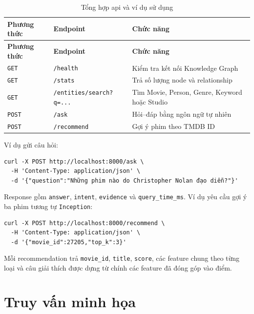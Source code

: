 \begin{longtable}{|>{\raggedright\arraybackslash}p{}|>{\raggedright\arraybackslash}p{}|>{\raggedright\arraybackslash}p{}|}
\caption{Tổng hợp api và ví dụ sử dụng}\label{tab:app-1} \\
\hline
\textbf{Phương thức} & \textbf{Endpoint} & \textbf{Chức năng} \\ \hline
\endfirsthead\hline \textbf{Phương thức} & \textbf{Endpoint} & \textbf{Chức năng} \\ \hline\endhead
\texttt{GET} & \texttt{/health} & Kiểm tra kết nối Knowledge Graph \\ \hline
\texttt{GET} & \texttt{/stats} & Trả số lượng node và relationship \\ \hline
\texttt{GET} & \texttt{/entities/search?q=...} & Tìm Movie, Person, Genre, Keyword hoặc Studio \\ \hline
\texttt{POST} & \texttt{/ask} & Hỏi–đáp bằng ngôn ngữ tự nhiên \\ \hline
\texttt{POST} & \texttt{/recommend} & Gợi ý phim theo TMDB ID \\ \hline
\end{longtable}

Ví dụ gửi câu hỏi:

\begin{Verbatim}[fontsize=\scriptsize,frame=single]
curl -X POST http://localhost:8000/ask \
  -H 'Content-Type: application/json' \
  -d '{"question":"Những phim nào do Christopher Nolan đạo diễn?"}'
\end{Verbatim}

Response gồm \texttt{answer}, \texttt{intent}, \texttt{evidence} và \texttt{query\_time\_ms}. Ví dụ yêu cầu gợi
ý ba phim tương tự \texttt{Inception}:

\begin{Verbatim}[fontsize=\scriptsize,frame=single]
curl -X POST http://localhost:8000/recommend \
  -H 'Content-Type: application/json' \
  -d '{"movie_id":27205,"top_k":3}'
\end{Verbatim}

Mỗi recommendation trả \texttt{movie\_id}, \texttt{title}, \texttt{score}, các feature chung theo từng
loại và câu giải thích được dựng từ chính các feature đã đóng góp vào điểm.

\chapter{Truy vấn minh họa}

